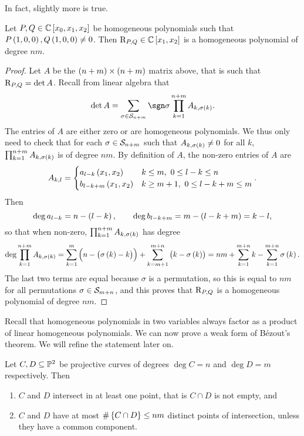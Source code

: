 \pagebreak

In fact, slightly more is true.

\begin{theorem}
\label{thm:9.7}
Let $ P, Q \in \CC\sbr{x_0, x_1, x_2} $ be homogeneous polynomials such that $ P\br{1, 0, 0}, Q\br{1, 0, 0} \ne 0 $. Then $ \R_{P, Q} \in \CC\sbr{x_1, x_2} $ is a homogeneous polynomial of degree $ nm $.
\end{theorem}

\begin{proof}
Let $ A $ be the $ \br{n + m} \times \br{n + m} $ matrix above, that is such that $ \mathrm{R}_{P, Q} = \det A $. Recall from linear algebra that
$$ \det A = \sum_{\sigma \in \SSS_{n + m}} \sgn \sigma\prod_{k = 1}^{n + m}A_{k, \sigma\br{k}}. $$
The entries of $ A $ are either zero or are homogeneous polynomials. We thus only need to check that for each $ \sigma \in \mathcal{S}_{n + m} $ such that $ A_{k, \sigma\br{k}} \ne 0 $ for all $ k $, $ \prod_{k = 1}^{n + m} A_{k, \sigma\br{k}} $ is of degree $ nm $. By definition of $ A $, the non-zero entries of $ A $ are
$$ A_{k, l} =
\begin{cases}
a_{l - k}\br{x_1, x_2} & k \le m, \ 0 \le l - k \le n \\
b_{l - k + m}\br{x_1, x_2} & k \ge m + 1, \ 0 \le l - k + m \le m
\end{cases}.
$$
Then
$$ \deg a_{l - k} = n - \br{l - k}, \qquad \deg b_{l - k + m} = m - \br{l - k + m} = k - l, $$
so that when non-zero, $ \prod_{k = 1}^{n + m} A_{k, \sigma\br{k}} $ has degree
$$ \deg \prod_{k = 1}^{n + m} A_{k, \sigma\br{k}} = \sum_{k = 1}^m \br{n - \br{\sigma\br{k} - k}} + \sum_{k = m + 1}^{m + n} \br{k - \sigma\br{k}} = nm + \sum_{k = 1}^{m + n} k - \sum_{k = 1}^{m + n} \sigma\br{k}. $$
The last two terms are equal because $ \sigma $ is a permutation, so this is equal to $ nm $ for all permutations $ \sigma \in \mathcal{S}_{m + n} $, and this proves that $ \mathrm{R}_{P, Q} $ is a homogeneous polynomial of degree $ nm $.
\end{proof}

Recall that homogeneous polynomials in two variables always factor as a product of linear homogeneous polynomials. We can now prove a weak form of B\'ezout's theorem. We will refine the statement later on.

\begin{theorem}
\label{thm:9.8}
Let $ C, D \subseteq \mathbb{P}^2 $ be projective curves of degrees $ \deg C = n $ and $ \deg D = m $ respectively. Then
\begin{enumerate}
\item $ C $ and $ D $ intersect in at least one point, that is $ C \cap D $ is not empty, and
\item $ C $ and $ D $ have at most $ \#\cbr{C \cap D} \le nm $ distinct points of intersection, unless they have a common component.
\end{enumerate}
\end{theorem}

